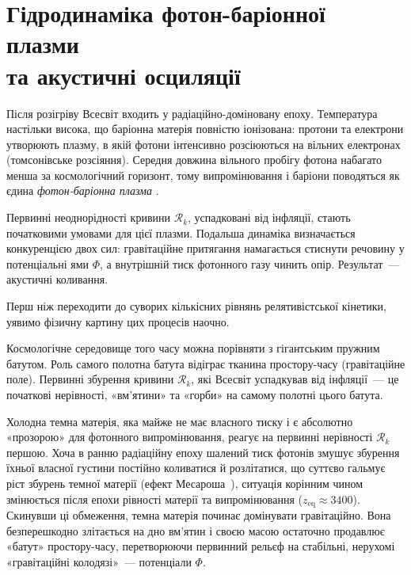 
\chapter{Гідродинаміка фотон-баріонної плазми\\ та акустичні осциляції}
\label{sec:bao}

Після розігріву Всесвіт входить у радіаційно-доміновану епоху.
Температура настільки висока, що баріонна матерія повністю
іонізована: протони та електрони утворюють плазму, в якій
фотони інтенсивно розсіюються на вільних електронах
(томсонівське розсіяння). Середня довжина вільного пробігу
фотона набагато менша за космологічний горизонт, тому
випромінювання і баріони поводяться як єдина
\emph{фотон-баріонна плазма} \cite{mukhanov_2005}.

Первинні неоднорідності кривини $\mathcal{R}_k$, успадковані
від інфляції, стають початковими умовами для цієї плазми.
Подальша динаміка визначається конкуренцією двох сил:
гравітаційне притягання намагається стиснути речовину у
потенціальні ями $\Phi$, а внутрішній тиск фотонного газу
чинить опір. Результат~--- акустичні коливання.

Перш ніж переходити до суворих кількісних рівнянь релятивістської
кінетики, уявимо фізичну картину цих процесів наочно.

Космологічне середовище того часу можна порівняти з гігантським
пружним батутом. Роль самого полотна батута відіграє тканина
простору-часу (гравітаційне поле). Первинні збурення кривини
$\mathcal{R}_k$, які Всесвіт успадкував від інфляції~--- це початкові
нерівності, «вм'ятини» та «горби» на самому полотні цього батута.

Холодна темна матерія, яка майже не має власного тиску і є абсолютно
«прозорою» для фотонного випромінювання, реагує на первинні нерівності
$\mathcal{R}_k$ першою. Хоча в ранню радіаційну епоху шалений тиск фотонів
змушує збурення їхньої власної густини постійно коливатися й розлітатися,
що суттєво гальмує ріст збурень темної матерії (ефект Месароша~\cite{Meszaros1974}),
ситуація корінним чином змінюється після епохи рівності матерії та випромінювання
($z_{\text{eq}} \approx 3400$). Скинувши ці обмеження, темна матерія починає
домінувати гравітаційно. Вона безперешкодно злітається на дно вм'ятин і своєю
масою остаточно продавлює «батут» простору-часу, перетворюючи первинний рельєф
на стабільні, нерухомі «гравітаційні колодязі»~--- потенціали $\Phi$.

